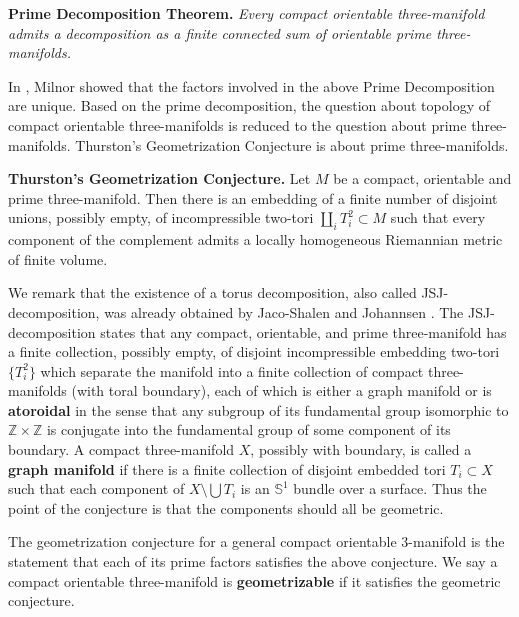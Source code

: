 \medskip
{\bf Prime Decomposition Theorem. } \emph{ Every compact orientable three-manifold admits a
decomposition as a finite connected sum of orientable prime
three-manifolds. }

\medskip
In \cite{Mil62}, Milnor showed that the factors involved in the
above Prime Decomposition are unique.  Based on the prime
decomposition, the question about topology of compact orientable
three-manifolds is reduced to the question about prime
three-manifolds. Thurston's Geometrization Conjecture is about
prime three-manifolds.

\medskip
{\bf Thurston's Geometrization Conjecture. } Let $M$ be a compact, orientable and
prime three-manifold. Then there is an embedding of a finite
number of disjoint unions, possibly empty, of incompressible
two-tori $\coprod_{i} T_i^2 \subset M$ such that every component
of the complement admits a locally homogeneous Riemannian metric
of finite volume.

\medskip
We remark that the existence of a torus decomposition, also called
JSJ-decomposition, was already obtained by Jaco-Shalen \cite{Jaco}
and Johannsen \cite{Joha}. The JSJ-decomposition states that any
compact, orientable, and prime three-manifold has a finite
collection, possibly empty, of disjoint incompressible embedding
two-tori $\{T_i^2\}$ which separate the manifold into a finite
collection of compact three-manifolds (with toral boundary), each
of which is either a graph manifold or is \textbf{atoroidal}
 in the sense that any subgroup of its
fundamental group isomorphic to $\mathbb{Z}\times\mathbb{Z}$ is
conjugate into the fundamental group of some component of its
boundary. A compact three-manifold $X$, possibly with boundary, is
called a \textbf{graph manifold} if there is
a finite collection of disjoint embedded tori $T_i \subset X$ such
that each component of $X \setminus \bigcup T_i$ is an
$\mathbb{S}^1$ bundle over a surface. Thus the point of the
conjecture is that the components should all be geometric.

The geometrization conjecture for a general compact orientable
3-man\-ifold is the statement that each of its prime factors
satisfies the above conjecture. We say a compact orientable
three-manifold is \textbf{geometrizable} if
it satisfies the geometric conjecture.

